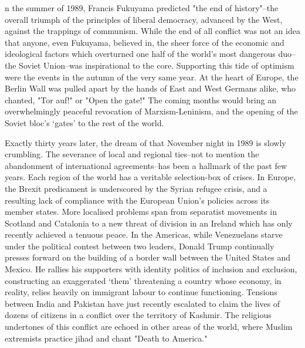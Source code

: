 \label{ch:open-the-gate}
n the summer of 1989, Francis Fukuyama predicted "the end of
   history"--the overall triumph of the principles of liberal democracy,
   advanced by the West, against the trappings of communism. While the end
   of all conflict was not an idea that anyone, even Fukuyama, believed
   in, the sheer force of the economic and ideological factors which
   overturned one half of the world's most dangerous duo--the Soviet
   Union--was inspirational to the core. Supporting this tide of optimism
   were the events in the autumn of the very same year. At the heart of
   Europe, the Berlin Wall was pulled apart by the hands of East and West
   Germans alike, who chanted, "Tor auf!" or "Open the gate!" The coming
   months would bring an overwhelmingly peaceful revocation of
   Marxism-Leninism, and the opening of the Soviet bloc's `gates' to the
   rest of the world.

   Exactly thirty years later, the dream of that November night in 1989 is
   slowly crumbling. The severance of local and regional ties--not to
   mention the abandonment of international agreements--has been a
   hallmark of the past few years. Each region of the world has a
   veritable selection-box of crises. In Europe, the Brexit predicament is
   underscored by the Syrian refugee crisis, and a resulting lack of
   compliance with the European Union's policies across its member states.
   More localised problems span from separatist movements in Scotland and
   Catalonia to a new threat of division in an Ireland which has only
   recently achieved a tenuous peace. In the Americas, while Venezuelans
   starve under the political contest between two leaders, Donald Trump
   continually presses forward on the building of a border wall between
   the United States and Mexico. He rallies his supporters with identity
   politics of inclusion and exclusion, constructing an exaggerated `them'
   threatening a country whose economy, in reality, relies heavily on
   immigrant labour to continue functioning. Tensions between India and
   Pakistan have just recently escalated to claim the lives of dozens of
   citizens in a conflict over the territory of Kashmir. The religious
   undertones of this conflict are echoed in other areas of the world,
   where Muslim extremists practice jihad and chant "Death to America."

